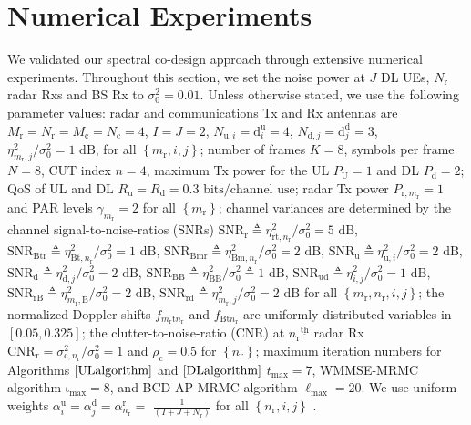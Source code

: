 \documentclass[10pt,journal]{IEEEtran}
\newcommand{\paren}[1]{\left({#1}\right)}
\newcommand{\bracket}[1]{{\left [{#1}\right ]}}
\newcommand{\braces}[1]{{\left\{ {#1}\right\}}}
\newcommand{\ith}[1]    {{#1}^{\underline{\text{th}}}}
\newcommand{\rr}{_\mathrm{r}}
\newcommand{\cc}{_\mathrm{c}}
\newcommand{\sfrac}[2]{#1/#2}
\theoremstyle{definition}
\begin{document}
\section{Numerical Experiments}
\label{sec:numerical}
We validated our spectral co-design approach through extensive numerical experiments. %
Throughout this section, we set the noise power at $\mathit{J}$ DL UEs, $\mathit{N}\rr$ radar Rxs and BS Rx to $\sigma^2_0=0.01$. Unless otherwise stated, we use the following parameter values: radar and communications Tx and Rx antennas are $\mathit{M}\rr=\mathit{N}\rr=\mathit{M}\cc=\mathit{N}\cc=4$, $\mathit{I}=\mathit{J}=2$, $\mathit{N}_{\mathrm{u},i}=\mathrm{d}^{\textrm{u}}_i=4$, $\mathit{N}_{\mathrm{d},j}=\mathrm{d}^{\textrm{d}}_j=3$,  $\sfrac{\eta^2_{m\rr,j}}{\sigma^2_0}=1\textrm{ dB}$, for all $\braces{m\rr,i,j}$; number of frames $\mathit{K}=8$, symbols per frame $\mathit{N}=8$, CUT index $n=4$, maximum Tx power for the UL $\mathit{P}_\textrm{U}=1$ and DL $\mathit{P}_\textrm{d}=2$; QoS of UL and DL $\mathit{R}_{\textrm{u}}=\mathit{R}_{\textrm{d}}=0.3\textrm{ bits/channel use}$; radar Tx power $\mathit{P}_{\textrm{r},m\rr}=1$ and PAR levels $\gamma_{m\rr}=2$ for all $\braces{m\rr}$; channel variances are determined by the channel signal-to-noise-ratios (SNRs) $\mathrm{SNR}_{\textrm{r}}\triangleq\sfrac{\eta^2_{\mathrm{rt},n\rr}}{\sigma^2_{0}}=5\textrm{ dB}$, $\mathrm{SNR}_{\textrm{Btr}}\triangleq\sfrac{\eta^2_{\textrm{Bt},n\rr}}{\sigma^2_{0}}=1 \textrm{ dB}$, $\mathrm{SNR}_{\textrm{Bmr}}\triangleq\sfrac{\eta^2_{\textrm{Bm},n\rr}}{\sigma^2_{0}}=2 \textrm{ dB}$, $\mathrm{SNR}_{\textrm{u}}\triangleq\sfrac{\eta^2_{\textrm{u},i}}{\sigma^2_{0}}=2\textrm{ dB}$, $\mathrm{SNR}_{\textrm{d}}\triangleq\sfrac{\eta^2_{\textrm{d},j}}{\sigma^2_0}=2\textrm{ dB}$, $\mathrm{SNR}_{\textrm{BB}}\triangleq\sfrac{\eta^2_{\textrm{BB}}}{\sigma^2_{0}}\triangleq1\textrm{ dB}$, $\mathrm{SNR}_{\textrm{ud}}\triangleq\sfrac{\eta^2_{i,j}}{\sigma^2_{0}}=1\textrm{ dB}$, $\mathrm{SNR}_{\textrm{rB}}\triangleq\sfrac{\eta^2_{m\rr,\textrm{B}}}{\sigma^2_0}=2\textrm{ dB}$, $\mathrm{SNR}_{\textrm{rd}}\triangleq\sfrac{\eta^2_{m\rr,j}}{\sigma^2_0}=2\textrm{ dB}$ for all $\braces{m\rr,n\rr,i,j}$; the normalized Doppler shifts $f_{m\rr\textrm{t}n\rr}$ and $f_{\textrm{Bt}n\rr}$ are uniformly distributed variables in $\bracket{0.05,0.325}$; the clutter-to-noise-ratio (CNR) at $\ith{n\rr}$ radar Rx $\mathrm{CNR}_{\textrm{r}}=\sfrac{\sigma^2_{\text{c},n\rr}}{\sigma^2_0}=1$ and $\rho_{\textrm{c}}=0.5$ for $\braces{n\rr}$; maximum iteration numbers for Algorithms $\ref{ULalgorithm}$ and $\ref{DLalgorithm}$ $t_{\textrm{max}}=7$, WMMSE-MRMC algorithm $\mathrm{\iota}_{\textrm{max}}=8$, and BCD-AP MRMC algorithm $\mathrm{\ell}_{\textrm{max}}=20$. We use uniform weights  $\alpha^\textrm{u}_{i}= \alpha^{\textrm{d}}_{j}=\alpha^\textrm{r}_{n\rr}=$ $\frac{1}{\paren{\mathit{I}+\mathit{J}+\mathit{N}\rr}}$ for all $\braces{n\rr,i,j}$ .
\end{document}
